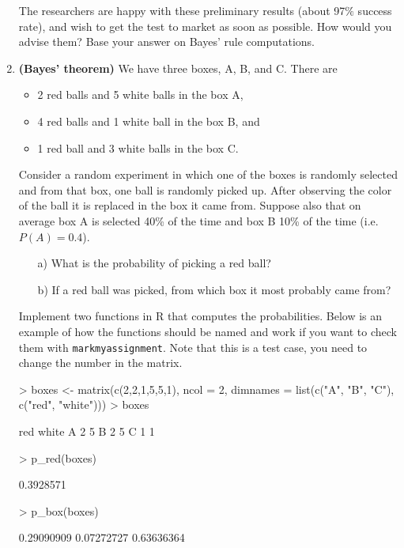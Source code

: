 \documentclass[11pt,a4paper,english]{article}
\begin{document}
\begin{enumerate}
  The researchers are happy with these preliminary results (about 97$\%$
  success rate), and wish to get the test to market as soon as possible. How would you advise them? Base your answer on Bayes' rule computations.

\item {\bf (Bayes' theorem)} We have three boxes, A, B, and C. There are
  \begin{itemize}
    \item 2 red balls and 5 white balls in the box A,
    \item 4 red balls and 1 white ball in the box B, and
    \item 1 red ball and 3 white balls in the box C.
  \end{itemize}
Consider a random experiment in which one of the boxes is randomly
selected and from that box, one ball is randomly picked up. After
observing the color of the ball it is replaced in the box it came
from. Suppose also that on average box A is selected 40\% of the time
and box B 10\% of the time (i.e. $P(A) = 0.4$).

\begin{itemize}
\item[a)] What is the probability of picking a red ball? 
\item[b)] If a red ball was picked, from which box it most probably came from? 
\end{itemize}

Implement two functions in R that computes the probabilities. Below is an example of how the functions should be named and work if you want to check them with \texttt{markmyassignment}. 
Note that this is a test case, you need to change the number in the matrix.

\begin{Schunk}
\begin{Sinput}
> boxes <- matrix(c(2,2,1,5,5,1), ncol = 2, 
     dimnames = list(c("A", "B", "C"), c("red", "white")))
> boxes
\end{Sinput}
\begin{Soutput}
  red white
A   2     5
B   2     5
C   1     1
\end{Soutput}
\end{Schunk}


\begin{Schunk}
\begin{Sinput}
> p_red(boxes)
\end{Sinput}
\begin{Soutput}
[1] 0.3928571
\end{Soutput}
\begin{Sinput}
> p_box(boxes)
\end{Sinput}
\begin{Soutput}
[1] 0.29090909 0.07272727 0.63636364
\end{Soutput}
\end{Schunk}



\end{enumerate}
\end{document}

